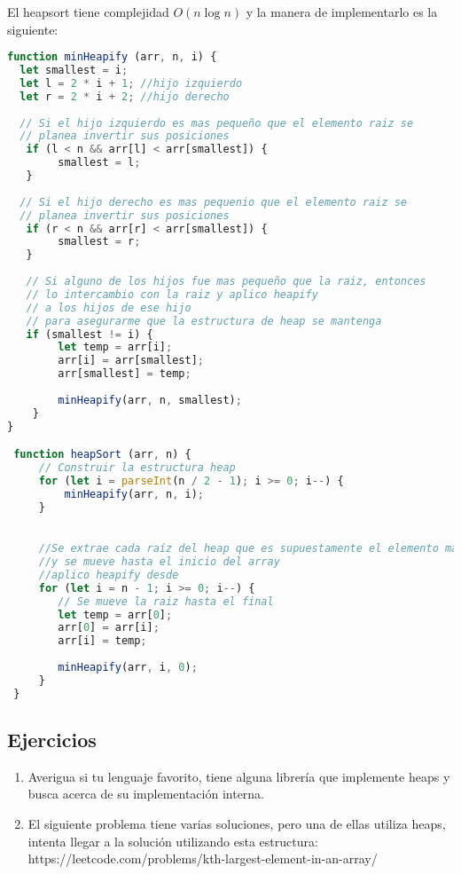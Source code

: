 El heapsort tiene complejidad $O(n \log n)$ y la manera de implementarlo es la siguiente:

\begin{lstlisting}[language=JavaScript, caption=Heap sort]
function minHeapify (arr, n, i) {
  let smallest = i;
  let l = 2 * i + 1; //hijo izquierdo
  let r = 2 * i + 2; //hijo derecho
  
  // Si el hijo izquierdo es mas pequeño que el elemento raiz se
  // planea invertir sus posiciones
   if (l < n && arr[l] < arr[smallest]) {
        smallest = l; 
   }
  
  // Si el hijo derecho es mas pequenio que el elemento raiz se
  // planea invertir sus posiciones
   if (r < n && arr[r] < arr[smallest]) {
        smallest = r; 
   }
  
   // Si alguno de los hijos fue mas pequeño que la raiz, entonces
   // lo intercambio con la raiz y aplico heapify 
   // a los hijos de ese hijo
   // para asegurarme que la estructura de heap se mantenga
   if (smallest != i) { 
        let temp = arr[i]; 
        arr[i] = arr[smallest]; 
        arr[smallest] = temp; 
  
        minHeapify(arr, n, smallest); 
    } 
}

 function heapSort (arr, n) { 
     // Construir la estructura heap 
     for (let i = parseInt(n / 2 - 1); i >= 0; i--) {
         minHeapify(arr, n, i); 
     }

  
     //Se extrae cada raíz del heap que es supuestamente el elemento mas pequeño
     //y se mueve hasta el inicio del array
     //aplico heapify desde 
     for (let i = n - 1; i >= 0; i--) { 
        // Se mueve la raiz hasta el final
        let temp = arr[0]; 
        arr[0] = arr[i]; 
        arr[i] = temp; 
  
        minHeapify(arr, i, 0); 
     } 
 }
\end{lstlisting}

\subsection{Ejercicios}

\begin{enumerate}
    \item Averigua si tu lenguaje favorito, tiene alguna librería que implemente heaps y busca acerca de su implementación interna.
    \item El siguiente problema tiene varias soluciones, pero una de ellas utiliza heaps, intenta llegar a la solución utilizando esta estructura: https://leetcode.com/problems/kth-largest-element-in-an-array/
\end{enumerate}


